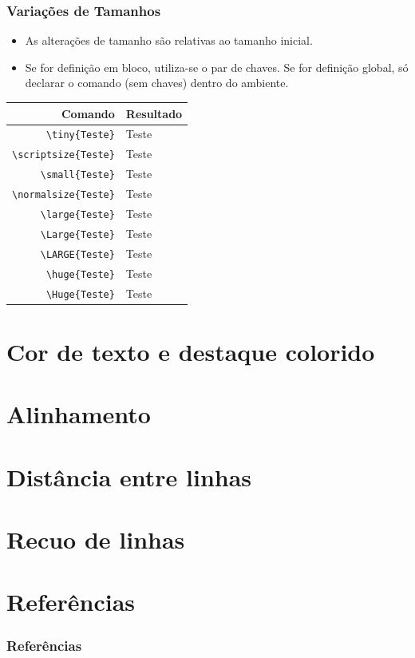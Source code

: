 \documentclass{beamer}
\begin{document}
\begin{frame}[fragile]
    \frametitle{Variações de Tamanhos}

    \begin{itemize}
        \item As alterações de tamanho são relativas ao tamanho inicial. 
        \item Se for definição em bloco, utiliza-se o par de chaves. Se for definição global, só declarar o comando (sem chaves) dentro do ambiente.
    \end{itemize}

    \begin{table}[h]
        \begin{tabular}{r|l}
            Comando & Resultado \\ \hline 
            \lstinline[style=myStyleLatex]!\tiny{Teste}! & \tiny{Teste} \\ \hline 
            \lstinline[style=myStyleLatex]!\scriptsize{Teste}! & \scriptsize{Teste} \\ \hline 
            \lstinline[style=myStyleLatex]!\small{Teste}! & \small{Teste} \\ \hline 
            \lstinline[style=myStyleLatex]!\normalsize{Teste}! & \normalsize{Teste} \\ \hline 
            \lstinline[style=myStyleLatex]!\large{Teste}! & \large{Teste} \\ \hline 
            \lstinline[style=myStyleLatex]!\Large{Teste}! & \Large{Teste} \\ \hline 
            \lstinline[style=myStyleLatex]!\LARGE{Teste}! & \LARGE{Teste} \\ \hline
            \lstinline[style=myStyleLatex]!\huge{Teste}! & \huge{Teste} \\ \hline
            \lstinline[style=myStyleLatex]!\Huge{Teste}! & \Huge{Teste} \\ \hline   
        \end{tabular}
    \end{table}

\end{frame}

\section{Cor de texto e destaque colorido}

\section{Alinhamento}

\section{Distância entre linhas}

\section{Recuo de linhas}

\section{Referências}
\begin{frame}[allowframebreaks]
    \frametitle{Referências}
    \nocite{*}
    \printbibliography[keyword={editText}]
\end{frame}
\end{document}
